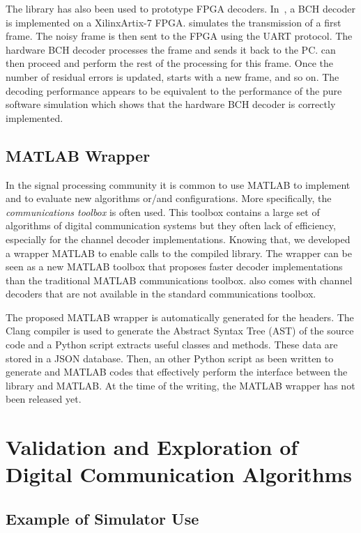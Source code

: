 The \AFFECT library has also been used to prototype FPGA decoders.
In~\cite{Cassagne2017a}, a BCH decoder is implemented on a Xilinx\R Artix-7
FPGA. \AFFECT simulates the transmission of a first frame. The noisy frame is
then sent to the FPGA using the UART protocol. The hardware BCH decoder
processes the frame and sends it back to the PC. \AFFECT can then proceed and
perform the rest of the processing for this frame. Once the number of residual
errors is updated, \AFFECT starts with a new frame, and so on. The decoding
performance appears to be equivalent to the performance of the pure software
simulation which shows that the hardware BCH decoder is correctly implemented.

\subsection{MATLAB Wrapper}

In the signal processing community it is common to use MATLAB to implement and
to evaluate new algorithms or/and configurations. More specifically, the
\emph{communications toolbox} is often used. This toolbox contains a large set
of algorithms of digital communication systems but they often lack of
efficiency, especially for the channel decoder implementations. Knowing that,
we developed a wrapper MATLAB to enable calls to the compiled \AFFECT library.
The wrapper can be seen as a new MATLAB toolbox that proposes faster decoder
implementations than the traditional MATLAB communications toolbox. \AFFECT
also comes with channel decoders that are not available in the standard
communications toolbox.

The proposed MATLAB wrapper is automatically generated for the \AFFECT headers.
The Clang compiler is used to generate the Abstract Syntax Tree (AST) of the
\AFFECT source code and a Python script extracts useful classes and methods.
These data are stored in a JSON database. Then, an other Python script as been
written to generate \Cxx and MATLAB codes that effectively perform the interface
between the \AFFECT library and MATLAB.
At the time of the writing, the MATLAB wrapper has not been released yet.

\section{Validation and Exploration of Digital Communication Algorithms}

\subsection{Example of Simulator Use}
\label{sec:aff3ct_simulator_example}

